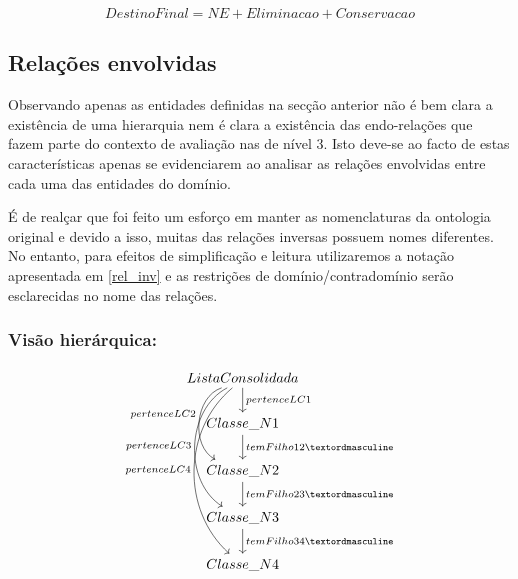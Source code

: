 \documentclass[tikz,runningheads,a4paper]{llncs}
\begin{document}
\begin{equation*}
    DestinoFinal = NE + Eliminacao + Conservacao
\end{equation*}

\subsection{Relações envolvidas}

Observando apenas as entidades definidas na secção anterior não é bem clara a existência de uma hierarquia nem é clara a existência das endo-relações que fazem parte do contexto de avaliação nas de nível 3. Isto deve-se ao facto de estas características apenas se evidenciarem ao analisar as relações envolvidas entre cada uma das entidades do domínio.

É de realçar que foi feito um esforço em manter as nomenclaturas da ontologia original e devido a isso, muitas das relações inversas possuem nomes diferentes. No entanto, para efeitos de simplificação e leitura utilizaremos a notação apresentada em \ref{rel_inv} e as restrições de domínio/contradomínio serão esclarecidas no nome das relações.

\subsubsection{Visão hierárquica:}

\begin{equation}
\label{vis_geral}
\begin{tikzcd}
ListaConsolidada \arrow{d}{pertenceLC1} \arrow[swap,bend right=67]{dd}{pertenceLC2} \arrow[swap,bend right=60]{ddd}{pertenceLC3} \arrow[swap,bend right=49]{dddd}{pertenceLC4} \\
Classe\_N1 \arrow{d}{temFilho12º}                                                                                                                                     \\
Classe\_N2 \arrow{d}{temFilho23º}                                                                                                                                     \\
Classe\_N3 \arrow{d}{temFilho34º}                                                                                                                                     \\
Classe\_N4                                                                                                                                                             
\end{tikzcd}
\end{equation}
\end{document}
